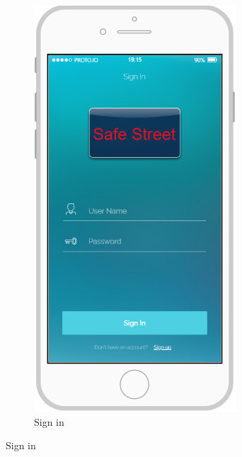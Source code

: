 \documentclass{article}
\begin{document}
		\begin{figure}[h]
			\centering
			\begin{subfigure}[h]{0.49\linewidth}
				\includegraphics[width=\linewidth]{images/Sign_In.png}
				\caption{Sign in}
				\label{fig:mob_signin}

\end{subfigure}
\end{figure}
\end{document}
